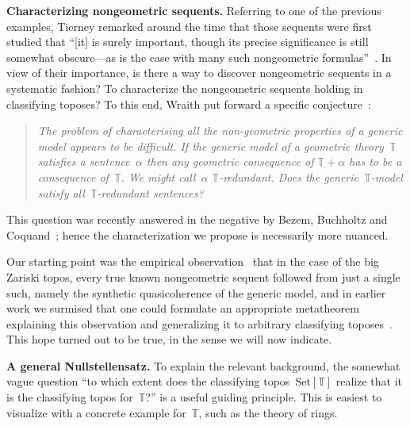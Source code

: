 \documentclass[oneside,reqno]{amsart}
\theoremstyle{definition}
\theoremstyle{plain}
\theoremstyle{remark}
\newcommand{\TT}{\mathbb{T}}
\newcommand{\Set}{\mathrm{Set}}
\renewcommand{\_}{\mathpunct{.}\,}
\newcommand{\?}{\,{:}\,}
\renewcommand{\paragraph}[1]{\noindent\textbf{#1.}}
\begin{document}
\paragraph{Characterizing nongeometric sequents} Referring to one of the previous
examples, Tierney remarked around the time that those sequents were first
studied that ``[it] is surely important, though its precise significance is
still somewhat obscure---as is the case with many such nongeometric
formulas''~\cite[p.~209]{tierney:spectrum}. In view of their importance, is
there a way to discover nongeometric sequents in a systematic fashion? To
characterize the nongeometric sequents holding in classifying toposes? To this
end, Wraith put forward a specific conjecture~\cite[p.~336]{wraith:intuitionistic-algebra}:
\begin{quote}
\emph{The problem of characterising all the non-geometric properties of a generic
model appears to be difficult. If the generic model of a geometric theory~$\TT$
satisfies a sentence~$\alpha$ then any geometric consequence of $\TT + \alpha$ has to be a
consequence of~$\TT$. We might call~$\alpha$ $\TT$-redundant. Does the
generic~$\TT$-model satisfy all~$\TT$-redundant sentences?}
\end{quote}
This question was recently answered in the negative by Bezem, Buchholtz and
Coquand~\cite{bezem-buchholtz-coquand:syntactic-forcing-models}; hence the
characterization we propose is necessarily more nuanced.

Our starting point was the empirical
observation~\cite[p.~164]{blechschmidt:phd} that in the case of the big
Zariski topos, every true known nongeometric sequent followed from just a
single such, namely the synthetic quasicoherence of the generic
model, and in earlier work we surmised that one could formulate an appropriate
metatheorem explaining this observation and generalizing it to arbitrary
classifying toposes~\cite[Speculation~22.1]{blechschmidt:phd}. This hope turned
out to be true, in the sense we will now indicate.
\medskip

\paragraph{A general Nullstellensatz} To explain the relevant background, the
somewhat vague question ``to which extent does the classifying
topos~$\Set[\TT]$ realize that it is the classifying topos for~$\TT$?'' is a
useful guiding principle. This is easiest to visualize with a concrete example
for~$\TT$, such as the theory of rings.
\end{document}
